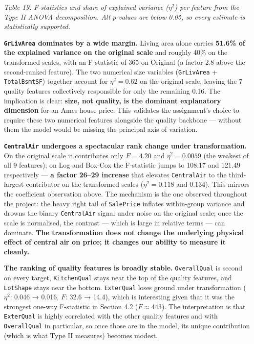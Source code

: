 \emph{Table 19: F-statistics and share of explained variance
(\(\eta^2\)) per feature from the Type II ANOVA decomposition. All
p-values are below 0.05, so every estimate is statistically supported.}

\textbf{\texttt{GrLivArea} dominates by a wide margin.} Living area
alone carries \textbf{51.6\% of the explained variance on the original
scale} and roughly 40\% on the transformed scales, with an F-statistic
of 365 on Original (a factor 2.8 above the second-ranked feature). The
two numerical size variables (\texttt{GrLivArea} + \texttt{TotalBsmtSF})
together account for \(\eta^2 = 0.62\) on the original scale, leaving
the 7 quality features collectively responsible for only the remaining
0.16. The implication is clear: \textbf{size, not quality, is the
dominant explanatory dimension} for an Ames house price. This validates
the assignment's choice to require these two numerical features
alongside the quality backbone --- without them the model would be
missing the principal axis of variation.

\textbf{\texttt{CentralAir} undergoes a spectacular rank change under
transformation.} On the original scale it contributes only \(F = 4.20\)
and \(\eta^2 = 0.0059\) (the weakest of all 9 features); on Log and
Box-Cox the F-statistic jumps to 108.17 and 121.49 respectively ---
\textbf{a factor 26--29 increase} that elevates \texttt{CentralAir} to
the third-largest contributor on the transformed scales
(\(\eta^2 = 0.118\) and 0.134). This mirrors the coefficient observation
above. The mechanism is the one observed throughout the project: the
heavy right tail of \texttt{SalePrice} inflates within-group variance
and drowns the binary \texttt{CentralAir} signal under noise on the
original scale; once the scale is normalised, the contrast --- which is
large in relative terms --- can dominate. \textbf{The transformation
does not change the underlying physical effect of central air on price;
it changes our ability to measure it cleanly.}

\textbf{The ranking of quality features is broadly stable.}
\texttt{OverallQual} is second on every target, \texttt{KitchenQual}
stays near the top of the quality features, and \texttt{LotShape} stays
near the bottom. \texttt{ExterQual} loses ground under transformation
(\(\eta^2\): 0.046 → 0.016, \(F\): 32.6 → 14.4), which is interesting
given that it was the strongest one-way F-statistic in Section 4.2
(\(F \approx 443\)). The interpretation is that \texttt{ExterQual} is
highly correlated with the other quality features and with
\texttt{OverallQual} in particular, so once those are in the model, its
unique contribution (which is what Type II measures) becomes modest.

